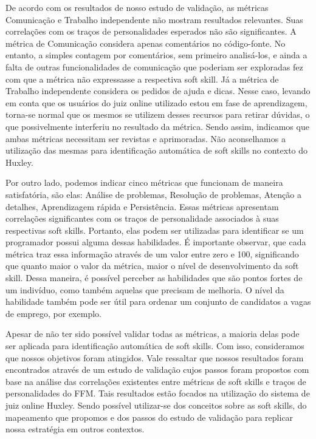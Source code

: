 De acordo com os resultados de nosso estudo de validação, as métricas Comunicação e Trabalho independente não mostram resultados relevantes. Suas correlações com os traços de personalidades esperados não são significantes. 
A métrica de Comunicação considera apenas comentários no código-fonte. No entanto, a simples contagem por comentários, sem primeiro analisá-los, e ainda a falta de outras funcionalidades de comunicação que poderiam ser exploradas fez com que a métrica não expressasse a respectiva soft skill.
Já a métrica de Trabalho independente considera os pedidos de ajuda e dicas. Nesse caso, levando em conta que os usuários do juiz online utilizado estou em fase de aprendizagem, torna-se normal que os mesmos se utilizem desses recursos para retirar dúvidas, o que possivelmente interferiu no resultado da métrica.
Sendo assim, indicamos que ambas métricas necessitam ser revistas e aprimoradas. Não aconselhamos a utilização das mesmas para identificação automática de soft skills no contexto do Huxley.

Por outro lado, podemos indicar cinco métricas que funcionam de maneira satisfatória, são elas: Análise de problemas, Resolução de problemas, Atenção a detalhes, Aprendizagem rápida e Persistência. Essas métricas apresentam correlações significantes com os traços de personalidade associados à suas respectivas soft skills.
Portanto, elas podem ser utilizadas para identificar se um programador possui alguma dessas habilidades. É importante observar, que cada métrica traz essa informação através de um valor entre zero e 100, significando que quanto maior o valor da métrica, maior o nível de desenvolvimento da soft skill. Dessa maneira, é possível perceber as habilidades que são pontos fortes de um indivíduo, como também aquelas que precisam de melhoria. O nível da habilidade também pode ser útil para ordenar um conjunto de candidatos a vagas de emprego, por exemplo.

Apesar de não ter sido possível validar todas as métricas, a maioria delas pode ser aplicada para identificação automática de soft skills. Com isso, consideramos que nossos objetivos foram atingidos.
Vale ressaltar que nossos resultados foram encontrados através de um estudo de validação cujos passos foram propostos com base na análise das correlações existentes entre métricas de soft skills e traços de personalidades do FFM. Tais resultados estão focados na utilização do sistema de juiz online Huxley. Sendo possível utilizar-se dos conceitos sobre as soft skills, do mapeamento que propomos e dos passos do estudo de validação para replicar nossa estratégia em outros contextos. 

